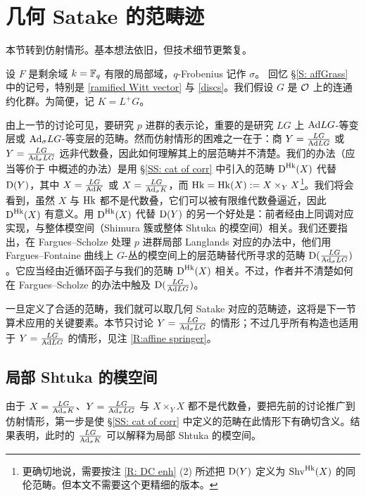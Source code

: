 \section{几何 Satake 的范畴迹}
\label{S: cattrSat}

本节转到仿射情形。基本想法依旧，但技术细节更繁复。

设 $F$ 是剩余域 $k={\mathbb F}_q$ 有限的局部域，$q$-Frobenius 记作 $\sigma$。
回忆 \S \ref{S: affGrass} 中的记号，特别是 \eqref{ramified Witt vector} 与 \eqref{discs}。我们假设 $G$ 是 ${\mathcal O}$ 上的连通约化群。为简便，记 $K=L^+G$。

由上一节的讨论可见，要研究 $p$ 进群的表示论，重要的是研究 $LG$ 上 ${\operatorname{Ad}} LG$-等变层或 ${\operatorname{Ad}}_\sigma LG$-等变层的范畴。然而仿射情形的困难之一在于：商 $Y=\frac{LG}{{\operatorname{Ad}} LG}$ 或 $Y=\frac{LG}{{\operatorname{Ad}}_\sigma LG}$ 远非代数叠，因此如何理解其上的层范畴并不清楚。我们的办法（应当等价于 \cite{Ga} 中概述的办法）是用 \S \ref{SS: cat of corr} 中引入的范畴 $\operatorname{D}^{\operatorname{Hk}}(X)$ 代替 $\operatorname{D}(Y)$，其中 $X=\frac{LG}{{\operatorname{Ad}} K}$ 或 $X=\frac{LG}{{\operatorname{Ad}}_\sigma  K}$，而 ${\operatorname{Hk}}={\operatorname{Hk}}(X):=X\times_YX$\footnote{更确切地说，需要按注 \ref{R: DC enh} (2) 所述把 $\operatorname{D}(Y)$ 定义为 $\mathrm{Shv}^{{\operatorname{Hk}}}(X)$ 的同伦范畴。但本文不需要这个更精细的版本。}。我们将会看到，虽然 $X$ 与 ${\operatorname{Hk}}$ 都不是代数叠，它们可以被有限维代数叠逼近，因此 $\operatorname{D}^{{\operatorname{Hk}}}(X)$ 有意义。用 $\operatorname{D}^{\operatorname{Hk}}(X)$ 代替 $\operatorname{D}(Y)$ 的另一个好处是：前者经由上同调对应实现，与整体模空间（Shimura 簇或整体 Shtuka 的模空间）相关。我们还要指出，在 Fargues–Scholze 处理 $p$ 进群局部 Langlands 对应的办法中，他们用 Fargues–Fontaine 曲线上 $G$-丛的模空间上的层范畴替代所寻求的范畴 $\operatorname{D}(\frac{LG}{{\operatorname{Ad}}_\sigma LG})$。它应当经由近循环函子与我们的范畴 $\operatorname{D}^{\operatorname{Hk}}(X)$ 相关。不过，作者并不清楚如何在 Fargues–Scholze 的办法中触及 $\operatorname{D}(\frac{LG}{{\operatorname{Ad}} LG})$。

一旦定义了合适的范畴，我们就可以取几何 Satake 对应的范畴迹，这将是下一节算术应用的关键要素。本节只讨论 $Y=\frac{LG}{{\operatorname{Ad}}_\sigma LG}$ 的情形；不过几乎所有构造也适用于 $Y=\frac{LG}{{\operatorname{Ad}} LG}$ 的情形，见注 \ref{R:affine springer}。

\subsection{局部 Shtuka 的模空间}

由于
$X=\frac{LG}{{\operatorname{Ad}}_\sigma K}$、$Y=\frac{LG}{{\operatorname{Ad}}_\sigma LG}$ 与 $X\times_YX$ 都不是代数叠，要把先前的讨论推广到仿射情形，第一步是使 \S \ref{SS: cat of corr} 中定义的范畴在此情形下有确切含义。结果表明，此时的 $\frac{LG}{{\operatorname{Ad}}_\sigma K}$ 可以解释为局部 Shtuka 的模空间。


